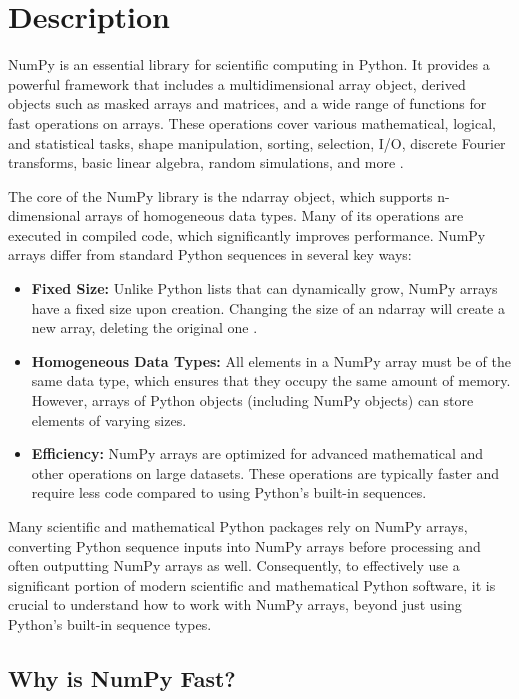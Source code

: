 \section{Description}

NumPy is an essential library for scientific computing in Python. It provides a powerful framework that includes a multidimensional array object, derived objects such as masked arrays and matrices, and a wide range of functions for fast operations on arrays. These operations cover various mathematical, logical, and statistical tasks, shape manipulation, sorting, selection, I/O, discrete Fourier transforms, basic linear algebra, random simulations, and more \cite{NumPy:2024}.

The core of the NumPy library is the ndarray object, which supports n-dimensional arrays of homogeneous data types. Many of its operations are executed in compiled code, which significantly improves performance. NumPy arrays differ from standard Python sequences in several key ways:

\begin{itemize}
	\item \textbf{Fixed Size:} Unlike Python lists that can dynamically grow, NumPy arrays have a fixed size upon creation. Changing the size of an ndarray will create a new array, deleting the original one \cite{NumPy:2024}.
	\item \textbf{Homogeneous Data Types:} All elements in a NumPy array must be of the same data type, which ensures that they occupy the same amount of memory. However, arrays of Python objects (including NumPy objects) can store elements of varying sizes.
	\item \textbf{Efficiency:} NumPy arrays are optimized for advanced mathematical and other operations on large datasets. These operations are typically faster and require less code compared to using Python’s built-in sequences.
\end{itemize}

Many scientific and mathematical Python packages rely on NumPy arrays, converting Python sequence inputs into NumPy arrays before processing and often outputting NumPy arrays as well. Consequently, to effectively use a significant portion of modern scientific and mathematical Python software, it is crucial to understand how to work with NumPy arrays, beyond just using Python’s built-in sequence types.

\subsection{Why is NumPy Fast?}

